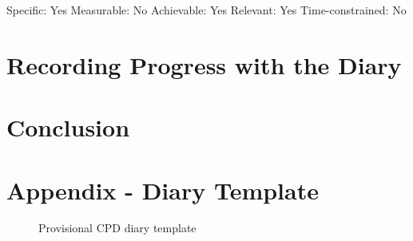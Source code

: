\documentclass{scrartcl}
\begin{document}
Specific: Yes
Measurable: No
Achievable: Yes
Relevant: Yes
Time-constrained: No



\section{Recording Progress with the Diary} %


\section{Conclusion} %





\newpage
\section{Appendix - Diary Template}
\begin{figure}[h]
\centering
\caption{Provisional CPD diary template}
\end{figure}
\end{document}
